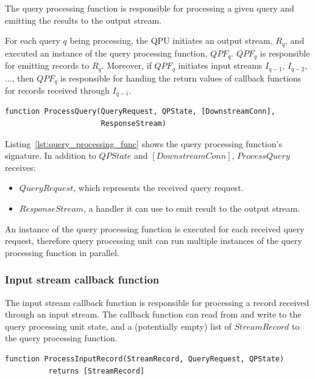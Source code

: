 The query processing function is responsible for processing a given query and emitting the results to the output stream.

For each query $q$ being processing, the QPU initiates an output stream, $R_q$,
and executed an instance of the query processing function, $QPF_q$.
$QPF_q$ is responsible for emitting records to $R_q$.
Moreover, if $QPF_q$ initiates input streams $I_{q-1}$, $I_{q-2}$, ..., then $QPF_q$ is responsible for handing the return
values of callback functions for records received through $I_{q-i}$.

\begin{lstlisting}[caption={Query processing function signature},captionpos=b,label={lst:query_processing_func}]
function ProcessQuery(QueryRequest, QPState, [DownstreamConn],
                      ResponseStream)
\end{lstlisting}

\noindent
\begin{sloppypar}
Listing~\ref{lst:query_processing_func} shows the query processing function's signature.
In addition to $QPState$ and $[DownstreamConn]$, $ProcessQuery$ receives:
\end{sloppypar}
\begin{itemize}
  \item $QueryRequest$, which represents the received query request.

  \item $ResponseStream$, a handler it can use to emit result to the output stream.

\end{itemize}

An instance of the query processing function is executed for each received query request,
therefore query processing unit can run multiple instances of the query processing function in parallel.

\subsubsection{Input stream callback function}
\label{sec:callback_func}

The input stream callback function is responsible for processing a record received through an input stream.
The callback function can read from and write to the query processing unit state,
and a (potentially empty) list of $StreamRecord$ to the query processing function.

\begin{lstlisting}[caption={Input stream callback function signature},captionpos=b,label={lst:callback_func}]
function ProcessInputRecord(StreamRecord, QueryRequest, QPState)
          returns [StreamRecord]
\end{lstlisting}

